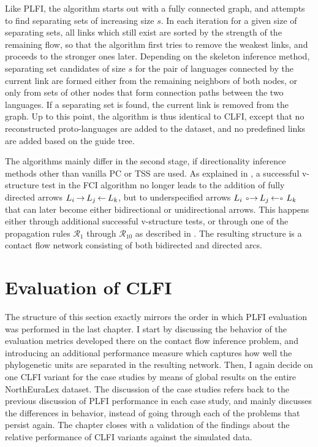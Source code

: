Like PLFI, the algorithm starts out with a fully connected graph, and attempts to find separating sets of increasing size $s$. In each iteration for a given size of separating sets, all links which still exist are sorted by the strength of the remaining flow, so that the algorithm first tries to remove the weakest links, and proceeds to the stronger ones later. Depending on the skeleton inference method, separating set candidates of size $s$ for the pair of languages connected by the current link are formed either from the remaining neighbors of both nodes, or only from sets of other nodes that form connection paths between the two languages. If a separating set is found, the current link is removed from the graph. Up to this point, the algorithm is thus identical to CLFI, except that no reconstructed proto-languages are added to the dataset, and no predefined links are added based on the guide tree.

The algorithms mainly differ in the second stage, if directionality inference methods other than vanilla PC or TSS are used. As explained in , a successful v-structure test in the FCI algorithm no longer leads to the addition of fully directed arrows $L_i \arrowLA L_j \arrowAL L_k$, but to underspecified arrows $L_i \arrowOA L_j \arrowAO L_k$ that can later become either bidirectional or unidirectional arrows. This happens either through additional successful v-structure tests, or through one of the propagation rules $\mathcal{R}_1$ through $\mathcal{R}_{10}$ as described in . The resulting structure is a contact flow network consisting of both bidirected and directed arcs.


\section{Evaluation of CLFI}\label{sec:7.6}
The structure of this section exactly mirrors the order in which PLFI evaluation was performed in the last chapter. I start by discussing the behavior of the evaluation metrics developed there on the contact flow inference problem, and introducing an additional performance measure which captures how well the phylogenetic units are separated in the resulting network. Then, I again decide on one CLFI variant for the case studies by means of global results on the entire NorthEuraLex dataset. The discussion of the case studies refers back to the previous discussion of PLFI performance in each case study, and mainly discusses the differences in behavior, instead of going through each of the problems that persist again. The chapter closes with a validation of the findings about the relative performance of CLFI variants against the simulated data.


